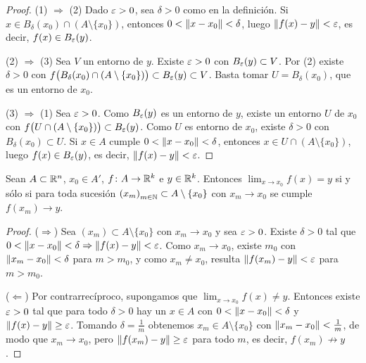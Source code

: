 \begin{proof}
  (1) \(\Rightarrow\) (2) Dado \(\varepsilon > 0\), sea \(\delta > 0\) como en la definición. Si \(x \in B_{\delta}(x_0) \cap (A \setminus \{x_0\})\), entonces \(0 < \left\lVert x - x_0 \right\rVert < \delta\), luego \(\left\lVert f(x) - y \right\rVert < \varepsilon\), es decir, \(f(x) \in B_{\varepsilon}(y)\).

  (2) \(\Rightarrow\) (3) Sea \(V\) un entorno de \(y\). Existe \(\varepsilon > 0\) con \(B_{\varepsilon}(y) \subset V\). Por (2) existe \(\delta > 0\) con \(f\bigl( B_{\delta}(x_0) \cap (A \setminus \{x_0\}) \bigr) \subset B_{\varepsilon}(y) \subset V\). Basta tomar \(U = B_{\delta}(x_0)\), que es un entorno de \(x_0\).

  (3) \(\Rightarrow\) (1) Sea \(\varepsilon > 0\). Como \(B_{\varepsilon}(y)\) es un entorno de \(y\), existe un entorno \(U\) de \(x_0\) con \(f\bigl( U \cap (A \setminus \{x_0\}) \bigr) \subset B_{\varepsilon}(y)\). Como \(U\) es entorno de \(x_0\), existe \(\delta > 0\) con \(B_{\delta}(x_0) \subset U\). Si \(x \in A\) cumple \(0 < \left\lVert x - x_0 \right\rVert < \delta\), entonces \(x \in U \cap (A \setminus \{x_0\})\), luego \(f(x) \in B_{\varepsilon}(y)\), es decir, \(\left\lVert f(x) - y \right\rVert < \varepsilon\).
\end{proof}

\begin{prop}
  Sean \(A \subset \mathbb{R}^n\), \(x_0 \in A'\), \(f\colon A \to \mathbb{R}^k\) e \(y \in \mathbb{R}^k\). Entonces \(\lim_{x \to x_0} f(x) = y\) si y sólo si para toda sucesión \({(x_m)}_{m \in \mathbb{N}} \subset A \setminus \{x_0\}\) con \(x_m \to x_0\) se cumple \(f(x_m) \to y\).
\end{prop}

\begin{proof}
  (\(\Rightarrow\)) Sea \({(x_m)} \subset A \setminus \{x_0\}\) con \(x_m \to x_0\) y sea \(\varepsilon > 0\). Existe \(\delta > 0\) tal que \(0 < \left\lVert x - x_0 \right\rVert < \delta \Rightarrow \left\lVert f(x) - y \right\rVert < \varepsilon\). Como \(x_m \to x_0\), existe \(m_0\) con \(\left\lVert x_m - x_0 \right\rVert < \delta\) para \(m > m_0\), y como \(x_m \neq x_0\), resulta \(\left\lVert f(x_m) - y \right\rVert < \varepsilon\) para \(m > m_0\).

  (\(\Leftarrow\)) Por contrarrecíproco, supongamos que \(\lim_{x \to x_0} f(x) \neq y\). Entonces existe \(\varepsilon > 0\) tal que para todo \(\delta > 0\) hay un \(x \in A\) con \(0 < \left\lVert x - x_0 \right\rVert < \delta\) y \(\left\lVert f(x) - y \right\rVert \geq \varepsilon\). Tomando \(\delta = \frac{1}{m}\) obtenemos \(x_m \in A \setminus \{x_0\}\) con \(\left\lVert x_m - x_0 \right\rVert < \frac{1}{m}\), de modo que \(x_m \to x_0\), pero \(\left\lVert f(x_m) - y \right\rVert \geq \varepsilon\) para todo \(m\), es decir, \(f(x_m) \not\to y\).
\end{proof}

